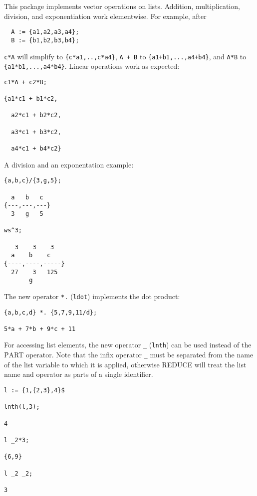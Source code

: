 

This package implements vector operations on lists.
Addition, multiplication, division, and exponentiation work elementwise.
For example, after
\begin{verbatim}
  A := {a1,a2,a3,a4};
  B := {b1,b2,b3,b4};
\end{verbatim}
\texttt{c*A} will simplify to \texttt{\{c*a1,..,c*a4\}},
\texttt{A + B} to \texttt{\{a1+b1,...,a4+b4\}}, and
\texttt{A*B} to \texttt{\{a1*b1,...,a4*b4\}}.
Linear operations work as expected:
\begin{verbatim}
c1*A + c2*B;

{a1*c1 + b1*c2,

  a2*c1 + b2*c2,

  a3*c1 + b3*c2,

  a4*c1 + b4*c2}
\end{verbatim}
A division and an exponentation example:
\begin{verbatim}
{a,b,c}/{3,g,5};

  a   b   c
{---,---,---}
  3   g   5

ws^3;

   3    3    3
  a    b    c
{----,----,-----}
  27    3   125
       g
\end{verbatim}
The new operator \texttt{*.} (\texttt{ldot})
 implements
the dot product:
\begin{verbatim}
{a,b,c,d} *. {5,7,9,11/d};

5*a + 7*b + 9*c + 11
\end{verbatim}
For accessing list elements, the new operator \texttt{\_} (\texttt{lnth})
can be used instead of the \f{PART} operator.
Note that the infix operator \texttt{\_} must be separated from the
name of the list variable to which it is applied, otherwise REDUCE
will treat the list name and operator as parts of a single identifier.
\begin{verbatim}
l := {1,{2,3},4}$

lnth(l,3);

4

l _2*3;

{6,9}

l _2 _2;

3
\end{verbatim}
